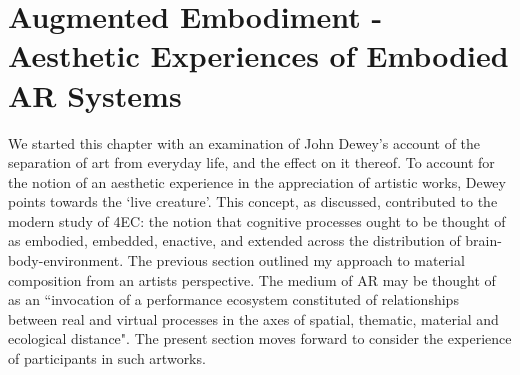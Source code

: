 \section[Augmented Embodiment]{Augmented Embodiment - Aesthetic Experiences of Embodied AR Systems}\label{sec: theory-embodiment}
We started this chapter with an examination of John Dewey's account of the separation of art from everyday life, and the effect on it thereof. To account for the notion of an aesthetic experience in the appreciation of artistic works, Dewey points towards the `live creature'. This concept, as discussed, contributed to the modern study of 4EC: the notion that cognitive processes ought to be thought of as embodied, embedded, enactive, and extended across the distribution of brain-body-environment. The previous section outlined my approach to material composition from an artists perspective. The medium of AR may be thought of as an ``invocation of a performance ecosystem constituted of relationships between real and virtual processes in the axes of spatial, thematic, material and ecological distance". The present section moves forward to consider the experience of participants in such artworks.

